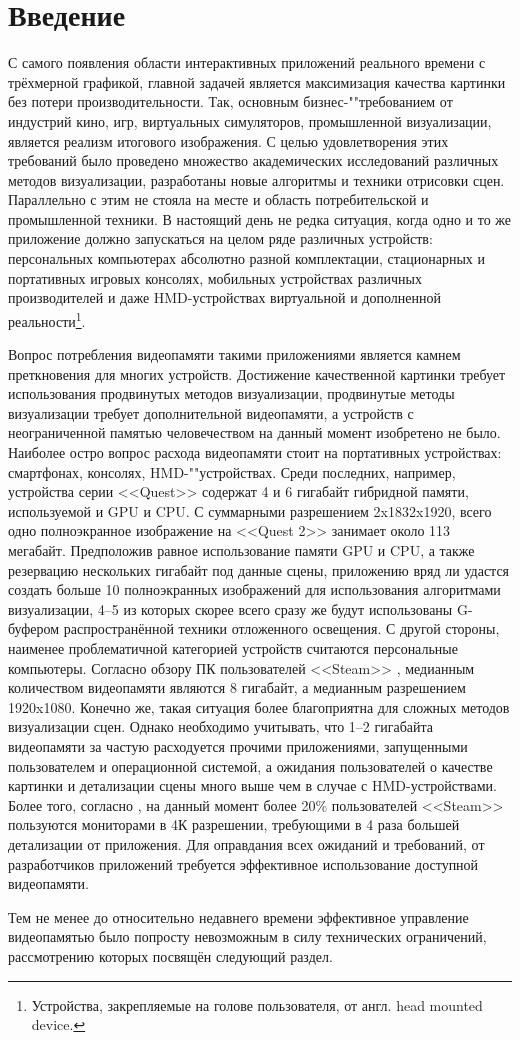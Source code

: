 \section{Введение}
С самого появления области интерактивных приложений реального времени с трёхмерной графикой, главной задачей является максимизация качества картинки без потери производительности.
Так, основным бизнес-""требованием от индустрий кино, игр, виртуальных симуляторов, промышленной визуализации, является реализм итогового изображения.
С целью удовлетворения этих требований было проведено множество академических исследований различных методов визуализации, разработаны новые алгоритмы и техники отрисовки сцен.
Параллельно с этим не стояла на месте и область потребительской и промышленной техники.
В настоящий день не редка ситуация, когда одно и то же приложение должно запускаться на целом ряде различных устройств: персональных компьютерах абсолютно разной комплектации, стационарных и портативных игровых консолях, мобильных устройствах различных производителей и даже HMD-устройствах виртуальной и дополненной реальности\footnote{Устройства, закрепляемые на голове пользователя, от англ. head mounted device.}.

Вопрос потребления видеопамяти такими приложениями является камнем преткновения для многих устройств.
Достижение качественной картинки требует использования продвинутых методов визуализации, продвинутые методы визуализации требует дополнительной видеопамяти, а устройств с неограниченной памятью человечеством на данный момент изобретено не было.
Наиболее остро вопрос расхода видеопамяти стоит на портативных устройствах: смартфонах, консолях, HMD-""устройствах.
Среди последних, например, устройства серии <<Quest>> содержат 4 и 6 гигабайт гибридной памяти, используемой и GPU и CPU.
С суммарными разрешением 2x1832x1920, всего одно полноэкранное изображение на <<Quest 2>> занимает около 113 мегабайт.
Предположив равное использование памяти GPU и CPU, а также резервацию нескольких гигабайт под данные сцены, приложению вряд ли удастся создать больше 10 полноэкранных изображений для использования алгоритмами визуализации, 4--5 из которых скорее всего сразу же будут использованы G-буфером распространённой техники отложенного освещения.
С другой стороны, наименее проблематичной категорией устройств считаются персональные компьютеры. Согласно обзору ПК пользователей <<Steam>> \cite{steamSurvey2023may}, медианным количеством видеопамяти являются 8 гигабайт, а медианным разрешением 1920x1080. Конечно же, такая ситуация более благоприятна для сложных методов визуализации сцен. Однако необходимо учитывать, что 1--2 гигабайта видеопамяти за частую расходуется прочими приложениями, запущенными пользователем и операционной системой, а ожидания пользователей о качестве картинки и детализации сцены много выше чем в случае с HMD-устройствами. Более того, согласно \cite{steamSurvey2023may}, на данный момент более 20\% пользователей <<Steam>> пользуются мониторами в 4К разрешении, требующими в 4 раза большей детализации от приложения. Для оправдания всех ожиданий и требований, от разработчиков приложений требуется эффективное использование доступной видеопамяти.

Тем не менее до относительно недавнего времени эффективное управление видеопамятью было попросту невозможным в силу технических ограничений, рассмотрению которых посвящён следующий раздел.
